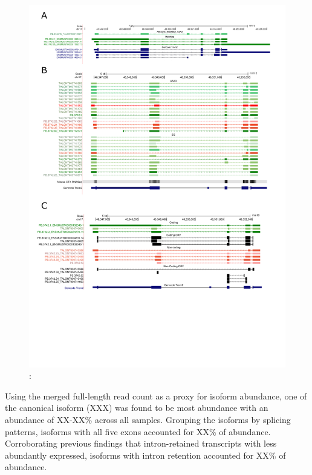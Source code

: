 \begin{landscape}
	\begin{figure}[htp]
		\begin{center}
			\includegraphics[page=2,trim={0 4cm 0 0},scale = 0.85]{Figures/pdfjoiner.pdf}
		\end{center}
		\captionsetup{width=0.95\textwidth}
		\caption[RNA-Seq defined transcriptome]%
		{\textbf{}: }   
		\label{fig:trem_track2}
	\end{figure}
\end{landscape}

Using the merged full-length read count as a proxy for isoform abundance, one of the canonical isoform (XXX) was found to be most abundance with an abundance of XX-XX\% across all samples. Grouping the isoforms by splicing patterns, isoforms with all five exons accounted for XX\% of abundance. Corroborating previous findings that intron-retained transcripts with less abundantly expressed, isoforms with intron retention accounted for XX\% of abundance.

